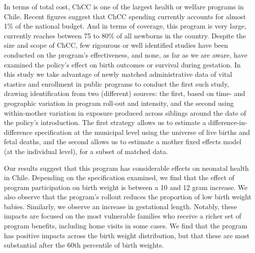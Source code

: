 \documentclass[12pt]{article}
\begin{document}
\begin{spacing}{1.4}
In terms of total cost, ChCC is one of the largest health or welfare
programs in Chile.  Recent figures suggest that ChCC spending currently
accounts for almost 1\% of the national budget. And in terms of coverage,
this program is very large, currently reaches between 75 to 80\% of all
newborns in the country. Despite the
size and scope of ChCC, few rigourous or well identified studies have been
conducted on the program's effectiveness, and none, as far as we are aware,
have examined the policy's effect on birth outcomes or survival
during gestation.%
In this study we take advantage of newly matched administrative data of
vital stastics and enrollment in public programs to conduct the first
such study, drawing identification from two (different) sources: the
first, based on time- and geographic variation in program roll-out and
intensity, and the second using within-mother variation in exposure
produced across siblings around the date of the policy's introduction.
The first strategy allows us to estimate a difference-in-difference
specification at the municipal level using the universe of live
births and fetal deaths, and the second allows us to estimate a
mother fixed effects model (at the individual level), for a subset of
matched data.

Our results suggest that this program has considerable effects on
neonatal health in Chile.  Depending on the specification examined,
we find that the effect of program participation on birth weight
is between a 10 and 12 gram increase.  We also observe that the
program's rollout reduces the proportion of low birth weight babies.
Similarly, we observe an increase in gestational length.  Notably,
these impacts are focused on the most vulnerable families who receive
a richer set of program benefits, including home visits in some cases.
We find that the program has positive impacts across the birth weight
distribution, but that these are most substantial after the 60th
percentile of birth weights.


\end{spacing}
\end{document}
